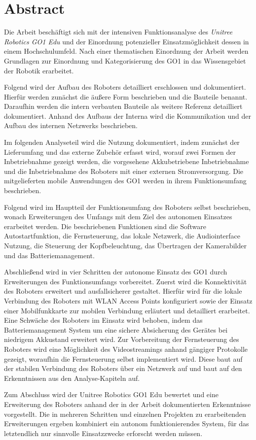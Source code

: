 \clearpage
{}
\pagestyle{empty}
\section*{Abstract}

Die Arbeit \emph{\mytitle{}} beschäftigt sich mit der intensiven Funktionsanalyse des \emph{Unitree Robotics GO1 Edu} und der
Einordnung potenzieller Einsatzmöglichkeit dessen in einem Hochschulumfeld.
Nach einer thematischen Einordnung der Arbeit werden Grundlagen zur Einordnung und Kategorisierung des GO1 in das Wissensgebiet
der Robotik erarbeitet.

Folgend wird der Aufbau des Roboters detailliert erschlossen und dokumentiert.
Hierfür werden zunächst die äußere Form beschrieben und die Bauteile benannt.
Daraufhin werden die intern verbauten Bauteile als weitere Referenz detailliert dokumentiert.
Anhand des Aufbaus der Interna wird die Kommunikation und der Aufbau des internen Netzwerks beschrieben.

Im folgenden Analyseteil wird die Nutzung dokumentiert, indem zunächst der Lieferumfang und das externe Zubehör erfasst wird, worauf zwei
Formen der Inbetriebnahme gezeigt werden, die vorgesehene Akkubetriebene Inbetriebnahme und die Inbetriebnahme
des Roboters mit einer externen Stromversorgung.
Die mitgelieferten mobile Anwendungen des GO1 werden in ihrem Funktionsumfang beschrieben.

Folgend wird im Hauptteil der Funktionsumfang des Roboters selbst beschrieben, wonach Erweiterungen des Umfangs mit
dem Ziel des autonomen Einsatzes erarbeitet werden.
Die beschriebenen Funktionen sind die Software Autostartfunktion, die Fernsteuerung, das lokale Netzwerk,
die Audiointerface Nutzung, die Steuerung der Kopfbeleuchtung, das Übertragen der Kamerabilder und das Batteriemanagement.

Abschließend wird in vier Schritten der autonome Einsatz des GO1 durch Erweiterungen des Funktionsumfangs vorbereitet.
Zuerst wird die Konnektivität des Roboters erweitert und ausfallsicherer gestaltet.
Hierfür wird für die lokale Verbindung des Roboters mit WLAN Access Points konfiguriert sowie der Einsatz einer
Mobilfunkkarte zur mobilen Verbindung erläutert und detailliert erarbeitet.
Eine Schwäche des Roboters im Einsatz wird behoben, indem das Batteriemanagement System um eine sichere Absicherung
des Gerätes bei niedrigem Akkustand erweitert wird.
Zur Vorbereitung der Fernsteuerung des Roboters wird eine Möglichkeit des Videostreamings anhand gängiger Protokolle
gezeigt, woraufhin die Fernsteuerung selbst implementiert wird.
Diese baut auf der stabilen Verbindung des Roboters über ein Netzwerk auf und baut auf den Erkenntnissen aus den Analyse-Kapiteln auf.

Zum Abschluss wird der Unitree Robotics GO1 Edu bewertet und eine Erweiterung des Roboters anhand der in der Arbeit
dokumentierten Erkenntnisse vorgestellt.
Die in mehreren Schritten und einzelnen Projekten zu erarbeitenden Erweiterungen ergeben kombiniert ein autonom
funktionierendes System, für das letztendlich nur sinnvolle Einsatzzwecke erforscht werden müssen.

\restoregeometry


